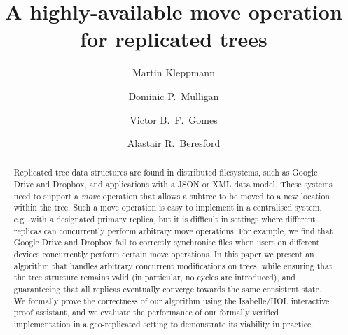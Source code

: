 \documentclass[sigconf]{acmart}
\begin{document}
\title{A highly-available move operation for replicated trees}

\author{Martin Kleppmann}

\author{Dominic P.\ Mulligan}

\author{Victor B.\ F.\ Gomes}

\author{Alastair R.\ Beresford}


\begin{abstract}
    Replicated tree data structures are found in distributed filesystems, such as Google Drive and Dropbox, and applications with a JSON or XML data model.
    These systems need to support a \emph{move} operation that allows a subtree to be moved to a new location within the tree.
    Such a move operation is easy to implement in a centralised system, e.g.\ with a designated primary replica, but it is difficult in settings where different replicas can concurrently perform arbitrary move operations.
    For example, we find that Google Drive and Dropbox fail to correctly synchronise files when users on different devices concurrently perform certain move operations.
    In this paper we present an algorithm that handles arbitrary concurrent modifications on trees, while ensuring that the tree structure remains valid (in particular, no cycles are introduced), and guaranteeing that all replicas eventually converge towards the same consistent state.
    We formally prove the correctness of our algorithm using the Isabelle/HOL interactive proof assistant, and we evaluate the performance of our formally verified implementation in a geo-replicated setting to demonstrate its viability in practice.
\end{abstract}
\maketitle
\end{document}
